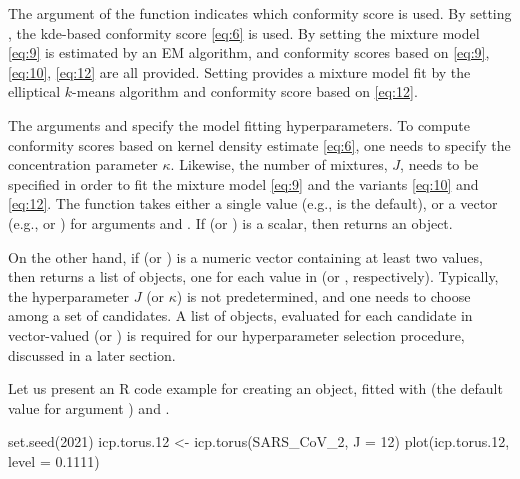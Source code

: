 The argument {} of the function {} indicates which conformity score is used. By setting {}, the kde-based conformity score \eqref{eq:6} is used. By setting {} the mixture model \eqref{eq:9} is estimated by an EM algorithm, and conformity scores based on \eqref{eq:9}, \eqref{eq:10}, \eqref{eq:12} are all provided. Setting {} provides a mixture model fit by the elliptical $k$-means algorithm and conformity score based on \eqref{eq:12}.

 The arguments  and  specify the model fitting hyperparameters. To compute conformity scores based on kernel density estimate \eqref{eq:6}, one needs to specify the concentration parameter $\kappa$. Likewise, the number of mixtures, $J$, needs to be specified in order to fit the mixture model \eqref{eq:9} and the variants \eqref{eq:10} and \eqref{eq:12}. The function  takes either a single value (e.g.,  is the default), or a vector (e.g.,  or ) for arguments  and . If   (or ) is a scalar, then  returns an  object. 
 
 On the other hand, if  (or ) is a numeric vector containing at least two values, then  returns a list of  objects, one for each value in   (or , respectively). Typically, the hyperparameter $J$ (or $\kappa$) is not predetermined, and one needs to choose among a set of candidates. A list of  objects, evaluated for each candidate in vector-valued  (or ) is required for our hyperparameter selection procedure, discussed in a later section.  

Let us present an R code example for creating an  object, fitted with  (the default value for argument ) and .

\begin{example}
set.seed(2021)
icp.torus.12 <- icp.torus(SARS_CoV_2, J = 12)
plot(icp.torus.12, level = 0.1111)
\end{example}

